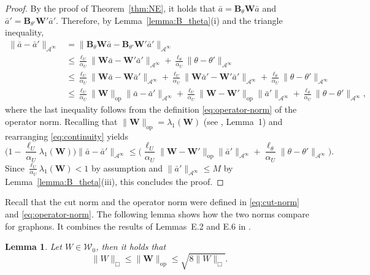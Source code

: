 \documentclass[11pt]{article}
\newcommand{\be}{\begin{equation}}
\newcommand{\ee}{\end{equation}}
\newtheorem{lemma}[theorem]{Lemma}
\numberwithin{equation}{section}
\begin{document}
\begin{proof}
By the proof of Theorem~\ref{thm:NE}, it holds that $\bar{a}=\boldsymbol{B}_\theta \boldsymbol{W}\bar{a}$ and $\bar{a}'=\boldsymbol{B}_{\theta'} \boldsymbol{W'}\bar{a}'$. Therefore, by  Lemma~\ref{lemma:B_theta}(i) and the triangle inequality,
\be\begin{aligned}\label{eq:continuity}
\|\bar a-\bar a'\|_{\mathcal{A}^\infty}&= \|\boldsymbol{B}_\theta \boldsymbol{W}\bar{a}-\boldsymbol{B}_{\theta'} \boldsymbol{W'}\bar{a}'\|_{\mathcal{A}^\infty}\\
&\leq \frac{\ell_U}{\alpha_U}\|\boldsymbol{W}\bar{a}-\boldsymbol{W'}\bar{a}'\|_{\mathcal{A}^\infty}+\frac{\ell_\theta}{\alpha_U}\|\theta-\theta'\|_{\mathcal{A}^\infty}\\
&\leq \frac{\ell_U}{\alpha_U}\|\boldsymbol{W}\bar{a}-\boldsymbol{W}\bar{a}'\|_{\mathcal{A}^\infty}+\frac{\ell_U}{\alpha_U}\|\boldsymbol{W}\bar{a}'-\boldsymbol{W'}\bar{a}'\|_{\mathcal{A}^\infty}+\frac{\ell_\theta}{\alpha_U}\|\theta-\theta'\|_{\mathcal{A}^\infty}\\
&\leq \frac{\ell_U}{\alpha_U}\|\boldsymbol{W}\|_{\operatorname{op}}\|\bar{a}-\bar{a}'\|_{\mathcal{A}^\infty}+\frac{\ell_U}{\alpha_U}\|\boldsymbol{W}-\boldsymbol{W'}\|_{\operatorname{op}}\|\bar{a}'\|_{\mathcal{A}^\infty}+\frac{\ell_\theta}{\alpha_U}\|\theta-\theta'\|_{\mathcal{A}^\infty},
\end{aligned}\ee
where the last inequality follows from the definition \eqref{eq:operator-norm} of the operator norm. Recalling that $\|\boldsymbol{W}\|_{\operatorname{op}}=\lambda_{1}(\boldsymbol{W})$ (see \cite{avella2018centrality}, Lemma~1) and rearranging \eqref{eq:continuity} yields 
$$
\big(1-\frac{\ell_U}{\alpha_U}\lambda_{1}(\boldsymbol{W})\big)\|\bar{a}-\bar{a}'\|_{\mathcal{A}^\infty}\leq \Big(\frac{\ell_U}{\alpha_U}\|\boldsymbol{W}-\boldsymbol{W'}\|_{\operatorname{op}}\|\bar{a}'\|_{\mathcal{A}^\infty}+\frac{\ell_\theta}{\alpha_U}\|\theta-\theta'\|_{\mathcal{A}^\infty}\Big).
$$
Since $\frac{\ell_U}{\alpha_U}\lambda_{1}(\boldsymbol{W})<1$ by assumption and $\|\bar{a}'\|_{\mathcal{A}^\infty}\leq M$ by Lemma~\ref{lemma:B_theta}(iii), this concludes the proof. 
\end{proof}

Recall that the cut norm and the operator norm were defined in \eqref{eq:cut-norm} and  \eqref{eq:operator-norm}.
The following lemma shows how the two norms compare for graphons. It combines the results of Lemmas~E.2 and E.6 in \cite{janson2010graphons}. 
\begin{lemma}\label{lemma:relation-cut-op}
Let $W\in\mathcal{W}_0$, then it holds that
\be
\|W\|_\Box\leq \|\boldsymbol{W}\|_{\operatorname{op}}\leq  \sqrt{8\|W\|_\Box}.
\ee
\end{lemma}
  
\end{document}
